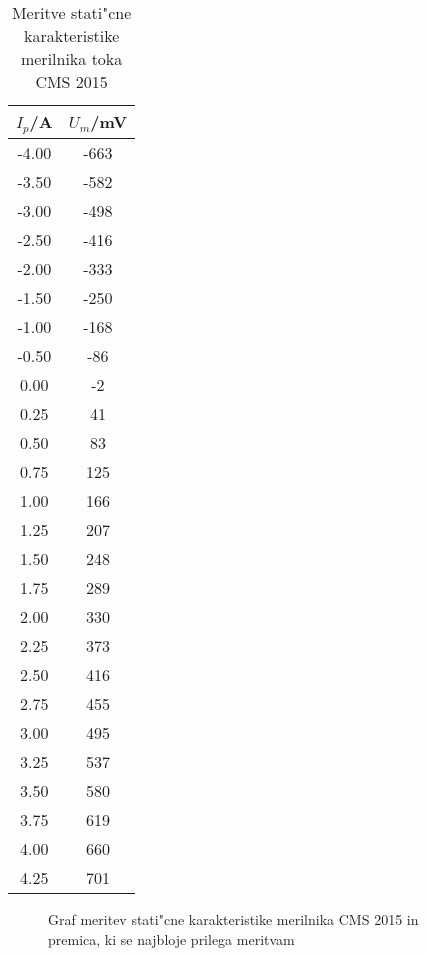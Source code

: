 \documentclass[10pt,a4paper]{article}
\begin{document}
	\begin{table}[h!]
	\centering
	
	
	\begin{tabular}{|c|c|}
		\hline
		\textbf{$I_p$}/A&\textbf{$U_m$}/mV
		\\\hline
-4.00&-663\\\hline
-3.50&-582\\\hline
-3.00&-498\\\hline
-2.50&-416\\\hline
-2.00&-333\\\hline
-1.50&-250\\\hline
-1.00&-168\\\hline
-0.50&-86\\\hline
0.00&-2\\\hline
0.25&41\\\hline
0.50&83\\\hline
0.75&125\\\hline
1.00&166\\\hline
1.25&207\\\hline
1.50&248\\\hline
1.75&289\\\hline
2.00&330\\\hline
2.25&373\\\hline
2.50&416\\\hline
2.75&455\\\hline
3.00&495\\\hline
3.25&537\\\hline
3.50&580\\\hline
3.75&619\\\hline
4.00&660\\\hline
4.25&701\\\hline
	\end{tabular}
	
	
	
	\caption{Meritve stati"cne karakteristike merilnika toka CMS 2015}
	
	
	\label{Tabela UI amr}
	\end{table}

\begin{figure}[h!]
	

\centering
\caption{Graf meritev stati"cne karakteristike merilnika CMS 2015 in premica, ki se najbloje prilega meritvam}
\label{UI_amr}
\end{figure}
\end{document}
